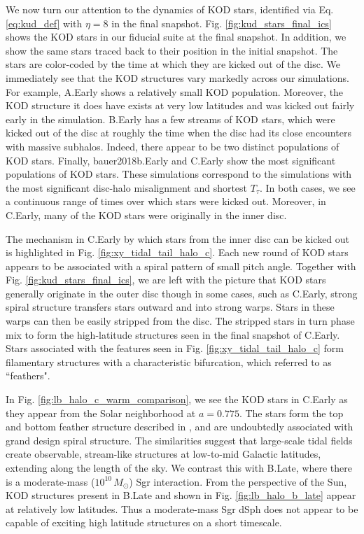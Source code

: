 We now turn our attention to the dynamics of KOD stars, identified via
Eq. \ref{eq:kud_def} with $\eta=8$ in the final
snapshot. Fig. \ref{fig:kud_stars_final_ics} shows the KOD stars in
our fiducial suite at the final snapshot. In addition, we show the
same stars traced back to their position in the initial snapshot. The
stars are color-coded by the time at which they are kicked out of the
disc.  We immediately see that the KOD structures vary markedly across
our simulations. For example, A.Early shows a relatively small KOD
population.  Moreover, the KOD structure it does have exists at very
low latitudes and was kicked out fairly early in the
simulation. B.Early has a few streams of KOD stars, which were kicked
out of the disc at roughly the time when the disc had its close
encounters with massive subhalos. Indeed, there appear to be two
distinct populations of KOD stars. Finally, bauer2018b.Early and
C.Early show the most significant populations of KOD stars.  These
simulations correspond to the simulations with the most significant
disc-halo misalignment and shortest $T_\tau$. In both cases, we see a
continuous range of times over which stars were kicked out. Moreover,
in C.Early, many of the KOD stars were originally in the inner disc.

The mechanism in C.Early by which stars from the inner disc can be
kicked out is highlighted in Fig. \ref{fig:xy_tidal_tail_halo_c}. Each
new round of KOD stars appears to be associated with a spiral pattern
of small pitch angle. Together with
Fig. \ref{fig:kud_stars_final_ics}, we are left with the picture that
KOD stars generally originate in the outer disc though in some cases,
such as C.Early, strong spiral structure transfers stars outward and
into strong warps. Stars in these warps can then be easily stripped
from the disc. The stripped stars in turn phase mix to form the
high-latitude structures seen in the final snapshot of C.Early.  Stars
associated with the features seen in
Fig. \ref{fig:xy_tidal_tail_halo_c} form filamentary structures with a
characteristic bifurcation, which \citet{laporte_2019_feathers}
referred to as ``feathers".

In Fig. \ref{fig:lb_halo_c_warm_comparison}, we see the KOD stars in
C.Early as they appear from the Solar neighborhood at $a=0.775$. The
stars form the top and bottom feather structure described in
\citet{laporte_2019_feathers}, and are undoubtedly associated with
grand design spiral structure. The similarities suggest that
large-scale tidal fields create observable, stream-like structures at
low-to-mid Galactic latitudes, extending along the length of the sky.
We contrast this with B.Late, where there is a moderate-mass
($10^{10}\,M_\odot$) Sgr interaction. From the perspective of the Sun,
KOD structures present in B.Late and shown in
Fig. \ref{fig:lb_halo_b_late} appear at relatively low latitudes. Thus
a moderate-mass Sgr dSph does not appear to be capable of exciting
high latitude structures on a short timescale.

